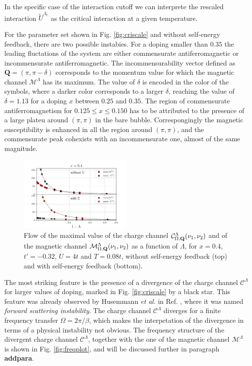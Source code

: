 In the specific case of the interaction cutoff we can interprete the rescaled interaction $\tilde U^{\Lambda_\mathrm{c}}$ as the critical interaction at a given temperature.

For the parameter set shown in Fig. \ref{fig:criscale} and without self-energy feedback, there are two possible instabies. 
For a doping smaller than $0.35$ the leading fluctations of the system are either commensurate antiferromagnetic or incommensurate antiferromagnetic. 
The incommensurability vector defined as $\mathbf{Q}=(\pi,\pi-\delta)$ corresponds to the momentum value for which the magnetic channel $\mathcal{M}^\Lambda$ has its maximum. The value of $\delta$ is encoded in the color of the symbols, where a darker color corresponds to a larger $\delta$, reaching the value of $\delta=1.13$ for a doping $x$ between $0.25$ and $0.35$. 
The region of commensurate antiferromagnetism for  $0.125\le x \le 0.150$ has to be attributed to the presence of a large plateu around $(\pi,\pi)$ in the bare bubble. Correspongingly the magnetic susceptibility is enhanced in all the region around $(\pi,\pi)$, and the commensurate peak cohexists with an incommensurate one, almost of the same magnitude.   
\begin{figure}
\includegraphics[width=0.50\textwidth]{images/chargeproblem_MC_vs_Lambda_fix_occ.png}
\caption{Flow of the maximal value of the charge channel $\mathcal{C}^\Lambda_{\Omega,\mathbf{Q}}(\nu_1,\nu_2)$ and of the magnetic channel $\mathcal{M}^\Lambda_{\Omega,\mathbf{Q}}(\nu_1,\nu_2)$ as a function of $\Lambda$, for  $x=0.4$, $t'=-0.32$, $U=4t$ and $T=0.08t$, without self-energy feedback (top) and with self-energy feedback (bottom). }
\label{fig:chargeproblem}
\end{figure}

The most striking feature is the presence of a divergence of the charge channel $\mathcal{C}^\Lambda$ for larger values of doping, marked in Fig. \ref{fig:criscale} by a black star. 
This feature was already observed by Husemmann \textit{et al.} in Ref. , where it was named \textit{forward scattering instability}. 
The charge channel $\mathcal{C}^\Lambda$ diverges for a finite frequency transfer $\Omega=2\pi/\beta$, which makes the interpetation of the divergence in terms of a physical instability not obvious. 
The frequency structure of the divergent charge channel $\mathcal{C}^\Lambda$, together with the one of the magnetic channel $\mathcal{M}^\Lambda$ is shown in Fig. \ref{fig:freqplot}, and will be discussed further in paragraph \textbf{addpara}.


